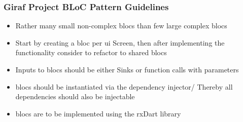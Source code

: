 \subsubsection{Giraf Project BLoC Pattern Guidelines}
\begin{itemize}
  \item Rather many small non-complex \glspl{bloc} than few large complex \glspl{bloc}
  \item Start by creating a \gls{bloc} per \gls{ui} Screen, then after implementing the functionality consider to refactor to shared \glspl{bloc}
  \item Inputs to \glspl{bloc} should be either Sinks or function calls with parameters
  \item \glspl{bloc} should be instantiated via the dependency injector/ Thereby all dependencies should also be injectable
  \item \glspl{bloc} are to be implemented using the rxDart library
\end{itemize}


